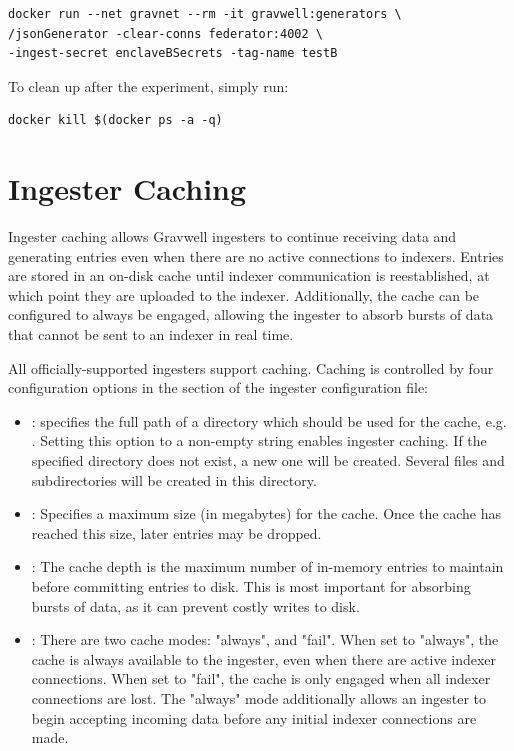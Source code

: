 \begin{Verbatim}[breaklines=true]
docker run --net gravnet --rm -it gravwell:generators \
/jsonGenerator -clear-conns federator:4002 \
-ingest-secret enclaveBSecrets -tag-name testB
\end{Verbatim}

To clean up after the experiment, simply run:

\begin{Verbatim}[breaklines=true]
docker kill $(docker ps -a -q)
\end{Verbatim}


\section{Ingester Caching}
Ingester caching allows Gravwell ingesters to continue receiving data
and generating entries even when there are no active connections to
indexers. Entries are stored in an on-disk cache until indexer
communication is reestablished, at which point they are uploaded to the
indexer. Additionally, the cache can be configured to always be engaged,
allowing the ingester to absorb bursts of data that cannot be sent to an
indexer in real time.

All officially-supported ingesters support caching. Caching is
controlled by four configuration options in the \code{[Global]} section of
the ingester configuration file:

\begin{itemize}
\item
  : specifies the full path of a directory which should
  be used for the cache, e.g.
  \code{/opt/gravwell/cache/file\_follow}. Setting this option to a
  non-empty string enables ingester caching. If the specified directory does
  not exist, a new one will be created. Several files and
  subdirectories will be created in this directory.
\item
  : Specifies a maximum size (in megabytes) for the
  cache. Once the cache has reached this size, later entries may be
  dropped.
\item
  : The cache depth is the maximum number of in-memory
  entries to maintain before committing entries to disk. This is
  most important for absorbing bursts of data, as it can prevent
  costly writes to disk.
\item
  : There are two cache modes: "always", and "fail". When set
  to "always", the cache is always available to the ingester,
  even when there are active indexer connections. When set to
  "fail", the cache is only engaged when all indexer connections
  are lost. The "always" mode additionally allows an ingester to begin
  accepting incoming data before any initial indexer connections
  are made.
\end{itemize}

